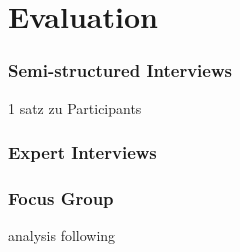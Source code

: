 \section{Evaluation}
\label{chap:evaluation}

\subsubsection{Semi-structured Interviews}
1 satz zu Participants

\subsubsection{Expert Interviews}

\subsubsection{Focus Group}
analysis following \cite{asbury1995overview}
